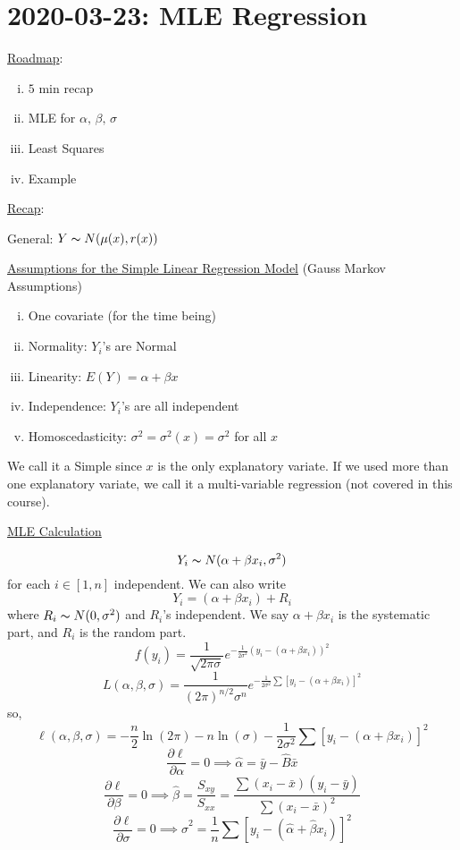 \section{2020-03-23: MLE Regression}
\underline{Roadmap}:
\begin{enumerate}[(i)]
    \item $ 5 $ min recap
    \item MLE for $ \alpha,\,\beta,\,\sigma $
    \item Least Squares
    \item Example
\end{enumerate}

\underline{Recap}:

General: $ Y \thicksim N(\mu(x),r(x)) $

\underline{Assumptions for the Simple Linear Regression Model}
(Gauss Markov Assumptions)
\begin{enumerate}[(i)]
    \item One covariate (for the time being)
    \item Normality: $ Y_i $'s are Normal
    \item Linearity: $ E(Y)=\alpha+\beta x $
    \item Independence: $ Y_i $'s are all independent
    \item Homoscedasticity: $ \sigma^2=\sigma^2(x)=\sigma^2 $ for all $ x $
\end{enumerate}
We call it a Simple since $ x $ is the only
explanatory variate. If we used more than one explanatory variate,
we call it a multi-variable regression (not covered in this course).

\underline{MLE Calculation}

\[ Y_i \thicksim N(\alpha+\beta x_i, \sigma^2) \]
for each $ i\in[1,n] $
independent. We can also write
\[ Y_i=(\alpha+\beta x_i)+R_i \]
where $ R_i \thicksim N(0,\sigma^2) $ and $ R_i $'s independent.
We say $ \alpha+\beta x_i $ is the systematic part, and $ R_i $ is the random part.
\[ f(y_i)=\frac{1}{\sqrt{2 \pi \sigma}}e^{-\frac{1}{2\sigma^2}(y_i-(\alpha+\beta x_i))^2}  \]
\[
    L(\alpha, \beta, \sigma)=
    \frac{1}{(2 \pi)^{n / 2} \sigma^{n}}
    e^{-\frac{1}{2 \sigma^{2}}
            \sum\left[y_{i}-\left(\alpha+\beta x_i\right)\right]^{2}}
\]
so,
\[ \ell(\alpha,\beta,\sigma)=-\frac{n}{2} \ln(2\pi)-n\ln(\sigma)-
    \frac{1}{2\sigma^2}\sum\left[y_{i}-\left(\alpha+\beta x_i\right)\right]^{2}  \]
\[ \frac{\partial\ell}{\partial\alpha}=0\implies
    \hat{\alpha}=\bar{y}-\hat{B}\bar{x} \]
\[ \frac{\partial \ell}{\partial \beta}=0\implies
    \hat{\beta}=\frac{S_{xy}}{S_{xx}}=\frac{\sum(x_i-\bar{x})(y_i-\bar{y})}
    {\sum (x_i-\bar{x})^2}  \]
\[ \frac{\partial\ell}{\partial \sigma}=0\implies
    \hat{\sigma}^2=\frac{1}{n} \sum \left[ y_i-(\hat{\alpha}+\hat{\beta}x_i) \right]^2 \]

